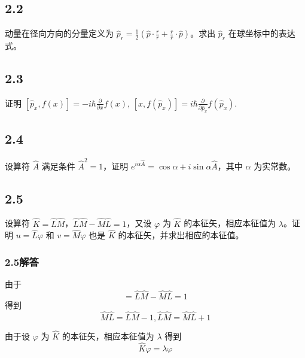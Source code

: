 \subsection{2.2}
动量在径向方向的分量定义为 $\hat{p}_r = \frac{1}{2} \left( \hat{p} \cdot \frac{r}{r} + \frac{r}{r} \cdot \hat{p} \right)$。求出 $\hat{p}_r$ 在球坐标中的表达式。



\subsection{2.3}
证明 $[\hat{p}_x, f(x)] = -i\hbar \frac{\partial}{\partial x} f(x)$, $[x, f(\hat{p}_x)] = i\hbar \frac{\partial}{\partial \hat{p}_x} f(\hat{p}_x)$.

\subsection{2.4}
设算符 $\hat{A}$ 满足条件 $\hat{A}^2 = 1$，证明 $e^{i\alpha \hat{A}} = \cos \alpha + i \sin \alpha \hat{A}$，其中 $\alpha$ 为实常数。

\subsection{2.5}
设算符 $\hat{K} = \hat{L} \hat{M}$，$\hat{L} \hat{M} - \hat{M} \hat{L} = 1$，又设 $\varphi$ 为 $\hat{K}$ 的本征矢，相应本征值为 $\lambda$。证明 $u = \hat{L} \varphi$ 和 $v = \hat{M} \varphi$ 也是 $\hat{K}$ 的本征矢，并求出相应的本征值。

\subsubsection{2.5解答}
由于
\begin{equation}
    [ \hat{L},\hat{M} ] =\hat{L}\hat{M}-\hat{M}\hat{L}=1
\end{equation}
得到
\begin{equation}
    \hat{M}\hat{L}=\hat{L}\hat{M}-1,\hat{L}\hat{M}=\hat{M}\hat{L}+1
\end{equation}

由于设 $\varphi$ 为 $\hat{K}$ 的本征矢，相应本征值为 $\lambda$
得到
\begin{equation}
    \hat{K}\varphi =\lambda \varphi 
\end{equation}

